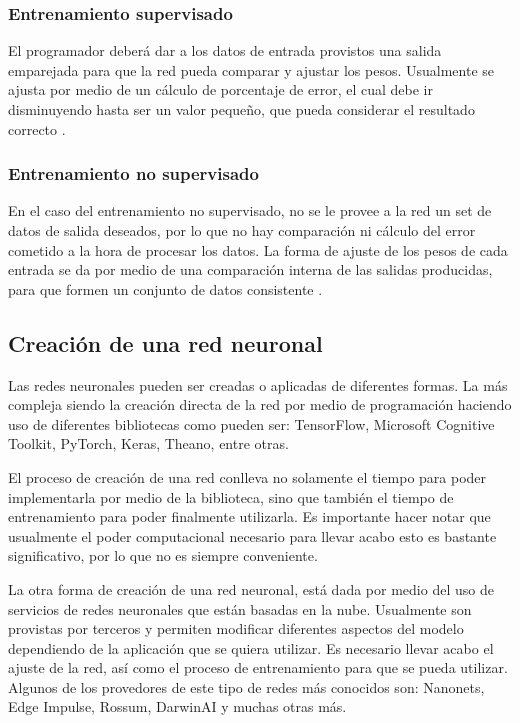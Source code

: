 \subsubsection{Entrenamiento supervisado}
El programador deberá dar a los datos de entrada provistos una salida emparejada para que la red pueda comparar y ajustar los pesos. Usualmente se ajusta por medio de un cálculo de porcentaje de error, el cual debe ir disminuyendo hasta ser un valor pequeño, que pueda considerar el resultado correcto \cite{olabe_2008}.
\subsubsection{Entrenamiento no supervisado}
En el caso del entrenamiento no supervisado, no se le provee a la red un set de datos de salida deseados, por lo que no hay comparación ni cálculo del error cometido a la hora de procesar los datos. La forma de ajuste de los pesos de cada entrada se da por medio de una comparación interna de las salidas producidas, para que formen un conjunto de datos consistente \cite{olabe_2008}. 
\subsection{Creación de una red neuronal}
Las redes neuronales pueden ser creadas o aplicadas de diferentes formas. La más compleja siendo la creación directa de la red por medio de programación haciendo uso de diferentes bibliotecas como pueden ser: TensorFlow, Microsoft Cognitive Toolkit, PyTorch, Keras, Theano, entre otras. 
\par
El proceso de creación de una red conlleva no solamente el tiempo para poder implementarla por medio de la biblioteca, sino que también el tiempo de entrenamiento para poder finalmente utilizarla. Es importante hacer notar que usualmente el poder computacional necesario para llevar acabo esto es bastante significativo, por lo que no es siempre conveniente.
\par
La otra forma de creación de una red neuronal, está dada por medio del uso de servicios de redes neuronales que están basadas en la nube. Usualmente son provistas por terceros y permiten modificar diferentes aspectos del modelo dependiendo de la aplicación que se quiera utilizar. Es necesario llevar acabo el ajuste de la red, así como el proceso de entrenamiento para que se pueda utilizar. Algunos de los provedores de este tipo de redes más conocidos son: Nanonets, Edge Impulse, Rossum, DarwinAI y muchas otras más.
